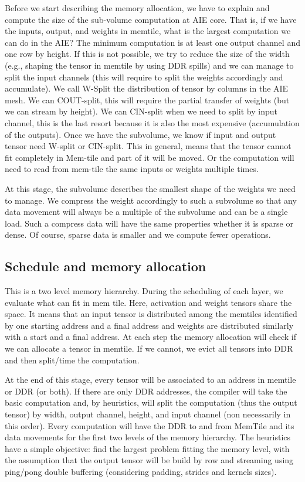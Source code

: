 \documentclass[sigconf]{acmart}
\begin{document}
Before we start describing the memory allocation, we have to explain
and compute the size of the sub-volume computation at AIE core.  That
is, if we have the inputs, output, and weights in memtile, what is the
largest computation we can do in the AIE? The minimum computation is
at least one output channel and one row by height. If this is not
possible, we try to reduce the size of the width (e.g., shaping the
tensor in memtile by using DDR spills) and we can manage to split the
input channels (this will require to split the weights accordingly and
accumulate). We call W-Split the distribution of tensor by columns in
the AIE mesh. We can COUT-split, this will require the partial
transfer of weights (but we can stream by height).  We can CIN-split
when we need to split by input channel, this is the last resort
because it is also the most expensive (accumulation of the
outputs). Once we have the subvolume, we know if input and output
tensor need W-split or CIN-split. This in general, means that the
tensor cannot fit completely in Mem-tile and part of it will be
moved. Or the computation will need to read from mem-tile the same
inputs or weights multiple times.

At this stage, the subvolume describes the smallest shape of the
weights we need to manage. We compress the weight accordingly to such
a subvolume so that any data movement will always be a multiple of the
subvolume and can be a single load. Such a compress data will have the
same properties whether it is sparse or dense. Of course, sparse data is
smaller and we compute fewer operations.


\subsection{Schedule and memory allocation}
This is a two level memory hierarchy. During the scheduling of each
layer, we evaluate what can fit in mem tile. Here, activation and
weight tensors share the space. It means that an input tensor is
distributed among the memtiles identified by one starting address and
a final address and weights are distributed similarly with a start and a final
address. At each step the memory allocation will check if we can
allocate a tensor in memtile. If we cannot, we evict all tensors into
DDR and then split/time the computation. 

At the end of this stage, every tensor will be associated to an
address in memtile or DDR (or both). If there are only DDR addresses,
the compiler will take the basic computation and, by heuristics, will
split the computation (thus the output tensor) by width, output
channel, height, and input channel (non necessarily in this
order). Every computation will have the DDR to and from MemTile and
its data movements for the first two levels of the memory
hierarchy. The heuristics have a simple objective: find the largest
problem fitting the memory level, with the assumption that the output
tensor will be build by row and streaming using ping/pong double
buffering (considering padding, strides and kernels sizes).
\end{document}
